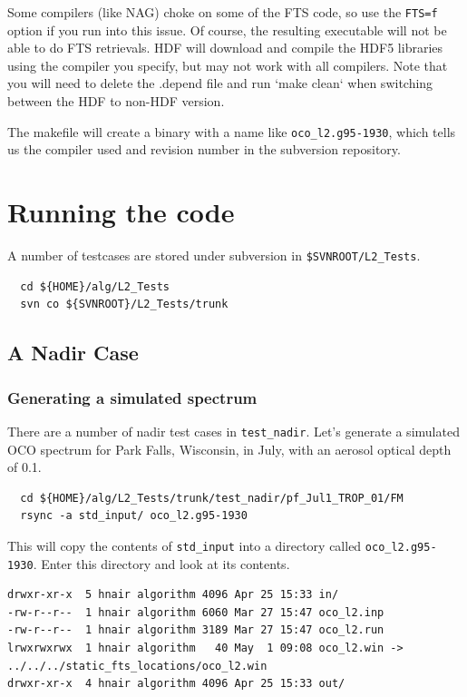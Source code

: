 \documentclass{article}
\begin{document}
Some compilers (like NAG) choke on some of the FTS code, so use the
\texttt{FTS=f} option if you run into this issue.  Of course, the
resulting executable will not be able to do FTS retrievals. HDF will download
and compile the HDF5 libraries using the compiler you specify, but may not
work with all compilers. Note that you will need to delete the .depend file and
run `make clean` when switching between the HDF to non-HDF version.

The makefile will create a binary with a name like
\texttt{oco\_l2.g95-1930}, which tells us the compiler used and revision
number in the subversion repository.

\section{Running the code}

A number of testcases are stored under subversion in
\texttt{\${SVNROOT}/L2\_Tests}.

\begin{verbatim}
  cd ${HOME}/alg/L2_Tests
  svn co ${SVNROOT}/L2_Tests/trunk
\end{verbatim}

\subsection{A Nadir Case}

\subsubsection{Generating a simulated spectrum}

There are a number of nadir test cases in \texttt{test\_nadir}.  Let's
generate a simulated OCO spectrum for Park Falls, Wisconsin, in July,
with an aerosol optical depth of 0.1.

\begin{verbatim}
  cd ${HOME}/alg/L2_Tests/trunk/test_nadir/pf_Jul1_TROP_01/FM
  rsync -a std_input/ oco_l2.g95-1930
\end{verbatim} %

This will copy the contents of \texttt{std\_input} into a directory
called \texttt{oco\_l2.g95-1930}.  Enter this directory and look at
its contents.

\begin{verbatim}
drwxr-xr-x  5 hnair algorithm 4096 Apr 25 15:33 in/
-rw-r--r--  1 hnair algorithm 6060 Mar 27 15:47 oco_l2.inp
-rw-r--r--  1 hnair algorithm 3189 Mar 27 15:47 oco_l2.run
lrwxrwxrwx  1 hnair algorithm   40 May  1 09:08 oco_l2.win -> ../../../static_fts_locations/oco_l2.win
drwxr-xr-x  4 hnair algorithm 4096 Apr 25 15:33 out/
\end{verbatim}
\end{document}
